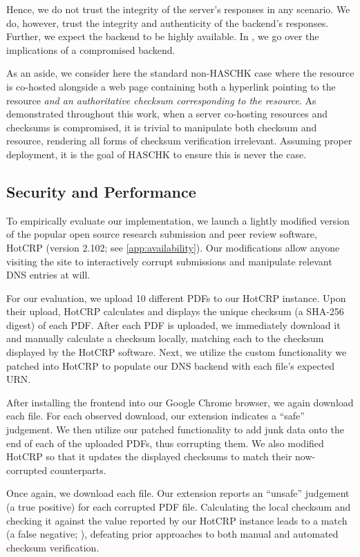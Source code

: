 Hence, we do not trust the integrity of the server's responses in any scenario.
We do, however, trust the integrity and authenticity of the backend's responses.
Further, we expect the backend to be highly available. In
, we go over the implications of a compromised backend.

As an aside, we consider here the standard non-HASCHK case where the resource is
co-hosted alongside a web page containing both a hyperlink pointing to the
resource \emph{and an authoritative checksum corresponding to the resource}. As
demonstrated throughout this work, when a server co-hosting resources and
checksums is compromised, it is trivial to manipulate both checksum and
resource, rendering all forms of checksum verification irrelevant. Assuming
proper deployment, it is the goal of HASCHK to ensure this is never the case.

\subsection{Security and Performance}

To empirically evaluate our implementation, we launch a lightly modified version
of the popular open source research submission and peer review software, HotCRP
(version 2.102; see \cref{app:availability}). Our modifications allow anyone
visiting the site to interactively corrupt submissions and manipulate relevant
DNS entries at will.

For our evaluation, we upload 10 different PDFs to our HotCRP instance. Upon
their upload, HotCRP calculates and displays the unique checksum (a SHA-256
digest) of each PDF. After each PDF is uploaded, we immediately download it and
manually calculate a checksum locally, matching each to the checksum displayed
by the HotCRP software. Next, we utilize the custom functionality we patched
into HotCRP to populate our DNS backend with each file's expected URN.

After installing the frontend into our Google Chrome browser, we again download
each file. For each observed download, our extension indicates a ``safe''
judgement. We then utilize our patched functionality to add junk data onto the
end of each of the uploaded PDFs, thus corrupting them. We also modified HotCRP
so that it updates the displayed checksums to match their now-corrupted
counterparts.

Once again, we download each file. Our extension reports an ``unsafe'' judgement
(a true positive) for each corrupted PDF file. Calculating the local checksum
and checking it against the value reported by our HotCRP instance leads to a
match (a false negative; ), defeating prior
approaches to both manual and automated checksum verification.

